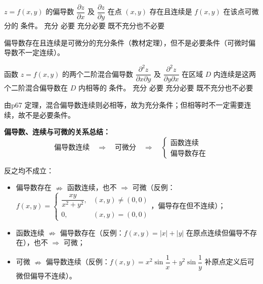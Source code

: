 \documentclass[answer]{THUExam}
\begin{document}
\begin{problem}
$z=f(x,y)$ 的偏导数 $\dfrac{\partial z}{\partial x}$ 及 $\dfrac{\partial z}{\partial y}$ 在点 $(x,y)$ 存在且连续是 $f(x,y)$ 在该点可微分的 \underline{\hspace{2em}} 条件。
\options
{充分}
{必要}
{充分必要}
{既不充分也不必要}
\end{problem}
\begin{note}
偏导数存在且连续是可微分的充分条件（教材定理），但不是必要条件（可微时偏导数不一定连续）。
\end{note}
\bigskip

\begin{problem}
函数 $z=f(x,y)$ 的两个二阶混合偏导数 $\dfrac{\partial^2 z}{\partial x\partial y}$ 及 $\dfrac{\partial^2 z}{\partial y\partial x}$ 在区域 $D$ 内连续是这两个二阶混合偏导数在 $D$ 内相等的 \underline{\hspace{2em}} 条件。
\options
{充分}
{必要}
{充分必要}
{既不充分也不必要}
\end{problem}
\begin{note}
由p67 定理，混合偏导数连续则必相等，故为充分条件；但相等时不一定需要连续，故不是必要条件。
\end{note}
\bigskip

\begin{note}
\textbf{偏导数、连续与可微的关系总结：}
\[
\text{偏导数连续}
\quad\Rightarrow\quad
\text{可微分}
\quad\Rightarrow\quad
\begin{cases}
\text{函数连续}\\[4pt]
\text{偏导数存在}
\end{cases}
\]

反之均不成立：
\begin{itemize}
	\item 偏导数存在 $\nRightarrow$ 函数连续，也不 $\Rightarrow$ 可微（反例：$f(x,y)=\begin{cases}\dfrac{xy}{x^2+y^2},&(x,y)\neq(0,0)\\0,&(x,y)=(0,0)\end{cases}$，偏导存在但不连续）；
	\item 函数连续 $\nRightarrow$ 偏导数存在（反例：$f(x,y)=|x|+|y|$ 在原点连续但偏导不存在），也不 $\Rightarrow$ 可微；
	\item 可微 $\nRightarrow$ 偏导数连续（反例：$f(x,y)=x^2\sin\dfrac{1}{x}+y^2\sin\dfrac{1}{y}$ 补原点定义后可微但偏导不连续）。
\end{itemize}
\end{note}
\bigskip
\end{document}
